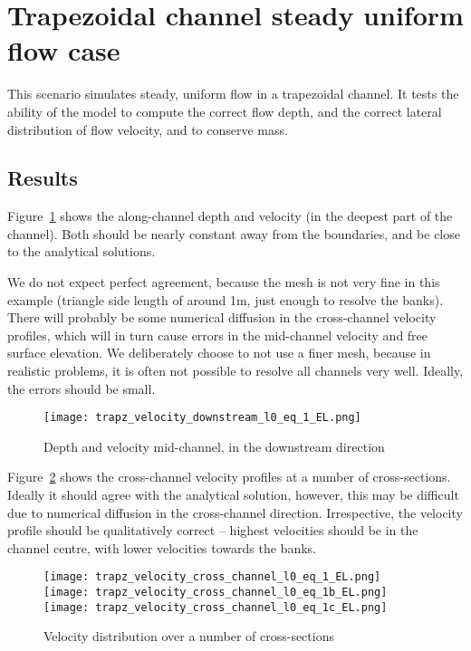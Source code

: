 \section{Trapezoidal channel steady uniform flow case}
This scenario simulates steady, uniform flow in a trapezoidal channel. It tests the ability of the model to compute the correct flow depth, and the correct lateral distribution of flow velocity, and to conserve mass.

\subsection{Results}
Figure~\ref{downstream_depth} shows the along-channel depth and velocity (in the deepest part of the channel). Both should be nearly constant away from the boundaries, and be close to the analytical solutions. 

We do not expect perfect agreement, because the mesh is not very fine in this example (triangle side length of around 1m, just enough to resolve the banks). There will probably be some numerical diffusion in the cross-channel velocity profiles, which will in turn cause errors in the mid-channel velocity and free surface elevation. We deliberately choose to not use a finer mesh, because in realistic problems, it is often not possible to resolve all channels very well. Ideally, the errors should be small.

\begin{figure}[h]
\begin{center}
\texttt{[image: trapz\_velocity\_downstream\_l0\_eq\_1\_EL.png]}
\caption{Depth and velocity mid-channel, in the downstream direction}
\label{downstream_depth}
\end{center}
\end{figure}

Figure~\ref{xsect_vels} shows the cross-channel velocity profiles at a number of cross-sections. Ideally it should agree with the analytical solution, however, this may be difficult due to numerical diffusion in the cross-channel direction. Irrespective, the velocity profile should be qualitatively correct -- highest velocities should be in the channel centre, with lower velocities towards the banks.

\begin{figure}[h]
\begin{center}
\texttt{[image: trapz\_velocity\_cross\_channel\_l0\_eq\_1\_EL.png]}
\texttt{[image: trapz\_velocity\_cross\_channel\_l0\_eq\_1b\_EL.png]}
\texttt{[image: trapz\_velocity\_cross\_channel\_l0\_eq\_1c\_EL.png]}
\caption{Velocity distribution over a number of cross-sections}
\label{xsect_vels}
\end{center}
\end{figure}

